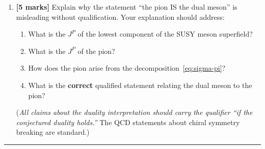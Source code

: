 \documentclass[11pt,a4paper]{article}
\begin{document}
\begin{enumerate}[label=(\alph*)]
  \item \textbf{[5 marks]}
    Explain why the statement ``the pion IS the dual meson'' is
    misleading without qualification.  Your explanation should
    address:
    \begin{enumerate}[label=(\roman*)]
      \item What is the $J^P$ of the lowest component of the SUSY
        meson superfield?
      \item What is the $J^P$ of the pion?
      \item How does the pion arise from the decomposition~\eqref{eq:sigma-pi}?
      \item What is the \textbf{correct} qualified statement relating
        the dual meson to the pion?
    \end{enumerate}
    (\textit{All claims about the duality interpretation should carry
    the qualifier ``if the conjectured duality holds.''}  The QCD
    statements about chiral symmetry breaking are standard.)

\end{enumerate}


\bigskip
\hrule
\bigskip
\end{document}
